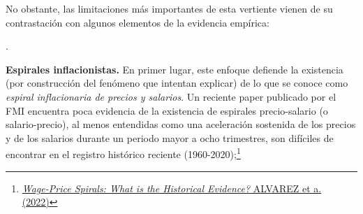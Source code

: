 \documentclass[10pt,a4paper]{article}
\newcounter{numitem}
\newenvironment{lnum}
      {\begin{list}{\arabic{numitem}.}{%
          \usecounter{numitem}%
          \setlength{\leftmargin}{1cm}%
          \setlength{\parskip}{3pt}%
          \setlength{\itemsep}{0pt}%
          \setlength{\parsep}{0pt}%
      }}
      {\end{list}}
\begin{document}
No obstante, las limitaciones más importantes de esta vertiente vienen de su contrastación con algunos elementos de la evidencia empírica:
\begin{lnum}
    \item \textbf{Espirales inflacionistas.} En primer lugar, este enfoque defiende la existencia (por construcción del fenómeno que intentan explicar) de lo que se conoce como \textit{espiral inflacionaria de precios y salarios}. Un reciente paper publicado por el FMI encuentra poca evidencia de la existencia de espirales precio-salario (o salario-precio), al menos entendidas como una aceleración sostenida de los precios y de los salarios durante un periodo mayor a ocho trimestres, son difíciles de encontrar en el registro histórico reciente (1960-2020);\footnote{
    \href{https://www.imf.org/en/publications/wp/issues/2022/11/11/wage-price-spirals-what-is-the-historical-evidence-525073}{\textit{Wage-Price Spirals: What is the Historical Evidence?} ALVAREZ et a. (2022)}
    
}
\end{lnum}
\end{document}

